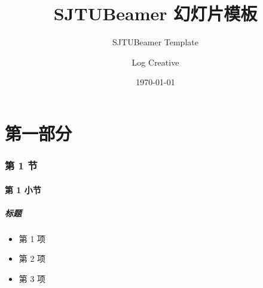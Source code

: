 \documentclass[
]{beamer}
\begin{document}
    \titlegraphic{                         %
        \begin{stampbox}[white]
        \end{stampbox}
    }
    \title{SJTUBeamer  幻灯片模板}  %
    \subtitle{SJTUBeamer  Template}         %
    \author{Log Creative}                  %
    \date{\today}                          %
    \maketitle                             %

\part{第一部分}


\AtBeginSubsection[]{                  %
    \begin{frame}
        \subsectionpage                %
    \end{frame}
}

\section{第 1 节}
\subsection{第 1 小节}

    \begin{frame}
        \frametitle{标题}

        \begin{itemize}
            \item 第 1 项
            \item 第 2 项
            \item 第 3 项
        \end{itemize}

    \end{frame}
\end{document}
